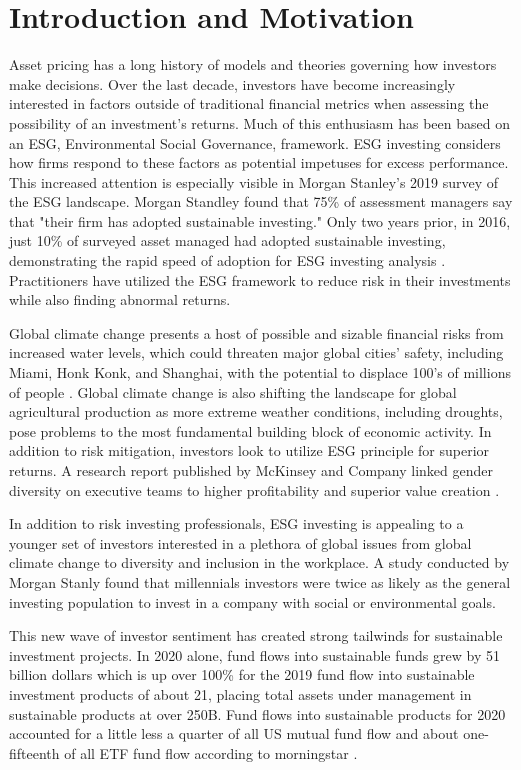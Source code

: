 \documentclass[12pt,oneside,reqno]{amsart}
\begin{document}
\section{Introduction and Motivation}
Asset pricing has a long history of models and theories governing how investors make decisions. Over the last decade, investors have become increasingly interested in factors outside of traditional financial metrics when assessing the possibility of an investment's returns. Much of this enthusiasm has been based on an ESG, Environmental Social Governance, framework. ESG investing considers how firms respond to these factors as potential impetuses for excess performance. This increased attention is especially visible in Morgan Stanley's 2019 survey of the ESG landscape. Morgan Standley  found that 75\% of assessment managers say that "their firm has adopted sustainable investing." Only two years prior, in 2016, just 10\% of surveyed asset managed had adopted sustainable investing, demonstrating the rapid speed of adoption for ESG investing analysis \cite{morgan_stanley_sustainable_2019}. Practitioners have utilized the ESG framework to reduce risk in their investments while also finding abnormal returns.

Global climate change presents a host of possible and sizable financial risks from increased water levels, which could threaten major global cities' safety, including Miami, Honk Konk, and Shanghai, with the potential to displace 100's of millions of people \cite{holder_three-degree_nodate}. Global climate change is also shifting the landscape for global agricultural production as more extreme weather conditions, including droughts, pose problems to the most fundamental building block of economic activity. In addition to risk mitigation, investors look to utilize ESG principle for superior returns. A research report published by McKinsey and Company linked gender diversity on executive teams to higher profitability and superior value creation \cite{mckinsey_diversity}.

In addition to risk investing professionals, ESG investing is appealing to a younger set of investors interested in a plethora of global issues from global climate change to diversity and inclusion in the workplace. A study conducted by Morgan Stanly found that millennials investors were twice as likely as the general investing population to invest in a company with social or environmental goals.

This new wave of investor sentiment has created strong tailwinds for sustainable investment projects. In 2020 alone, fund flows into sustainable funds grew by 51 billion dollars which is up over 100\% for the 2019 fund flow into sustainable investment products of about 21, placing total assets under management in sustainable products at over 250B. Fund flows into sustainable products for 2020 accounted for a little less a quarter of all US mutual fund flow and about one-fifteenth of all ETF fund flow according to morningstar \cite{monring_star_ESG}.
\end{document}
